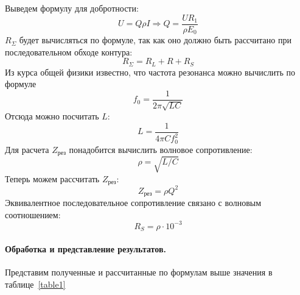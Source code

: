 \documentclass{physlab}
\begin{document}
Выведем формулу для добротности:
\begin{equation}
U=Q\rho I\Rightarrow Q =\frac{U R_1}{\rho E_0}
\end{equation}
$R_\Sigma$ будет вычисляться по формуле, так как оно должно быть рассчитано при последовательном обходе контура:
\begin{equation}
	R_\Sigma=R_L+R+R_S
	\label{eq:Rsum}
\end{equation}
Из курса общей физики известно, что частота резонанса можно вычислить по формуле
\begin{equation}
	f_0=\frac{1}{2\pi \sqrt{LC}}
\end{equation}
Отсюда можно посчитать $L$:
\begin{equation}
	L=\frac{1}{4\pi C f_0^2}
	\label{eq:L}
\end{equation}
Для расчета $Z_\text{рез}$ понадобится вычислить волновое сопротивление:
\begin{equation}
	\rho = \sqrt{L/C}
	\label{eq:rho}
\end{equation}
Теперь можем рассчитать  $Z_\text{рез}$:
\begin{equation}
	Z_\text{рез}=\rho Q^2
	\label{eq:Q}
\end{equation}
Эквивалентное последовательное сопротивление связано с волновым соотношением:
\begin{equation}
	R_S=\rho\cdot 10^{-3}
	\label{eq:RS}
\end{equation}
\paragraph{Обработка и представление результатов.} Представим полученные и рассчитанные по формулам выше значения в таблице~\ref{table1}
\end{document}
